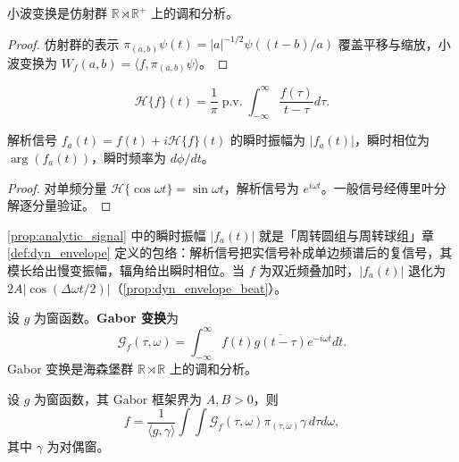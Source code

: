 \begin{proposition}[小波变换的群表示论基础]\label{prop:wavelet_group}
小波变换是仿射群 $\mathbb{R} \rtimes \mathbb{R}^+$ 上的调和分析。
\end{proposition}

\begin{proof}
仿射群的表示 $\pi_{(a,b)}\psi(t) = |a|^{-1/2}\psi((t-b)/a)$ 覆盖平移与缩放，小波变换为 $W_f(a,b) = \langle f, \pi_{(a,b)}\psi \rangle$。
\end{proof}

\begin{definition}[希尔伯特变换]\label{def:hilbert}
\[\mathcal{H}\{f\}(t) = \frac{1}{\pi} \operatorname{p.v.} \int_{-\infty}^{\infty} \frac{f(\tau)}{t-\tau} d\tau.\]
\end{definition}

\begin{proposition}[解析信号与瞬时参数]\label{prop:analytic_signal}
解析信号 $f_a(t) = f(t) + i\mathcal{H}\{f\}(t)$ 的瞬时振幅为 $|f_a(t)|$，瞬时相位为 $\arg(f_a(t))$，瞬时频率为 $d\phi/dt$。
\end{proposition}

\begin{proof}
对单频分量 $\mathcal{H}\{\cos\omega t\} = \sin\omega t$，解析信号为 $e^{i\omega t}$。一般信号经傅里叶分解逐分量验证。
\end{proof}

\begin{remark}[瞬时振幅即包络]\label{rem:analytic_envelope}
\cref{prop:analytic_signal} 中的瞬时振幅 $|f_a(t)|$ 就是「周转圆组与周转球组」章 \cref{def:dyn_envelope} 定义的包络：解析信号把实信号补成单边频谱后的复信号，其模长给出慢变振幅，辐角给出瞬时相位。当 $f$ 为双近频叠加时，$|f_a(t)|$ 退化为 $2A|\cos(\Delta\omega t/2)|$（\cref{prop:dyn_envelope_beat}）。
\end{remark}

\begin{definition}\label{def:gabor}
设 $g$ 为窗函数。\textbf{Gabor 变换}为
\[
\mathcal{G}_f(\tau,\omega)=\int_{-\infty}^{\infty}f(t)\overline{g(t-\tau)}e^{-i\omega t}dt.
\]
Gabor 变换是海森堡群 $\mathbb{R}\rtimes\mathbb{R}$ 上的调和分析。
\end{definition}

\begin{theorem}\label{thm:gabor_reconstruction}
设 $g$ 为窗函数，其 Gabor 框架界为 $A,B>0$，则
\[
f = \frac{1}{\langle g,\gamma\rangle}\int\int\mathcal{G}_f(\tau,\omega)\pi_{(\tau,\omega)}\gamma\,d\tau d\omega,
\]
其中 $\gamma$ 为对偶窗。
\end{theorem}

